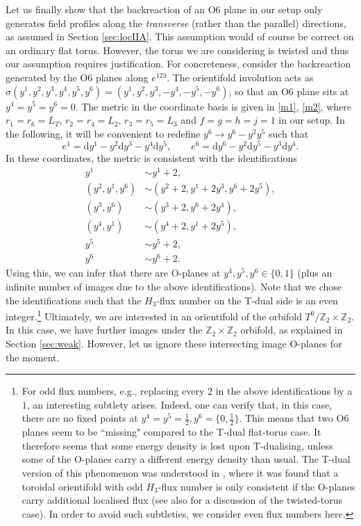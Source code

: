 \documentclass[11pt]{article}
\renewcommand{\[}{\left[}
\renewcommand{\]}{\right]}
\renewcommand{\(}{\left(}
\renewcommand{\)}{\right)}
\renewcommand{\d}{\textrm{d}}
\newcommand{\<}{\langle}
\renewcommand{\>}{\rangle}
\begin{document}
Let us finally show that the backreaction of an O6 plane in our setup only generates field profiles along the \emph{transverse} (rather than the parallel) directions, as assumed in Section \ref{sec:locIIA}. This assumption would of course be correct on an ordinary flat torus. However, the torus we are considering is twisted and thus our assumption requires justification. For concreteness, consider the backreaction generated by the O6 planes along $e^{123}$. The orientifold involution acts as $\sigma(y^1,y^2,y^3,y^4,y^5,y^6) = (y^1,y^2,y^3,-y^4,-y^5,-y^6)$, so that an O6 plane sits at $y^4=y^5=y^6=0$.
The metric in the coordinate basis is given in \eqref{m1}, \eqref{m2}, where $r_1=r_6=L_T$, $r_2=r_4=L_2$, $r_3=r_5=L_3$ and $f=g=h=j=1$ in our setup. In the following, it will be convenient to redefine $y^6\to y^6-y^2y^5$ such that
\begin{equation}
e^1 = \d y^1 - y^2 \d y^3 - y^4 \d y^5, \qquad e^6 = \d y^6 - y^2 \d y^5 - y^3 \d y^4.
\end{equation}
In these coordinates, the metric is consistent with the identifications
\begin{align}
 y^1&\sim y^1+2, \\
 (y^2,y^1,y^6) &\sim \left(y^2+2, y^1 + 2y^3 , y^6 + 2y^5\right),\\
 (y^3,y^6) &\sim \left( y^3+2, y^6 +2y^4 \right),  \\ 
 (y^4,y^1) &\sim \left( y^4+2, y^1 +2y^5 \right),\\
 y^5 &\sim y^5+2,\\
 y^6 &\sim y^6+2.
\end{align}
Using this, we can infer that there are  O-planes at $y^4,y^5,y^6\in\{0,1\}$ (plus an infinite number of images due to the above identifications). Note that we chose the identifications such that the $H_3$-flux number on the T-dual side is an even integer.\footnote{For odd flux numbers, e.g., replacing every $2$ in the above identifications by a $1$, an interesting subtlety arises. Indeed, one can verify that, in this case, there are no fixed points at $y^4=y^5=\frac{1}{2},y^6=\{0,\frac{1}{2}\}$. This means that two O6 planes seem to be ``missing"  compared to the T-dual flat-torus case. It therefore seems that some energy density is lost upon T-dualising, unless some of the O-planes carry a different energy density than usual. The T-dual version of this phenomenon was understood in \cite{Frey:2002hf}, where it was found that a toroidal orientifold with odd $H_3$-flux number is only consistent if the O-planes carry additional localised flux (see also \cite{Gur-Ari:2013sba} for a discussion of the twisted-torus case). In order to avoid such subtleties, we consider even flux  numbers here.}
Ultimately, we are interested in an orientifold of the orbifold $T^6/\mathbb{Z}_2 \times \mathbb{Z}_2$. In this case, we have further images under the $\mathbb{Z}_2 \times \mathbb{Z}_2$ orbifold, as explained in Section \ref{sec:weak}. However, let us ignore these intersecting image O-planes for the moment.
\end{document}
